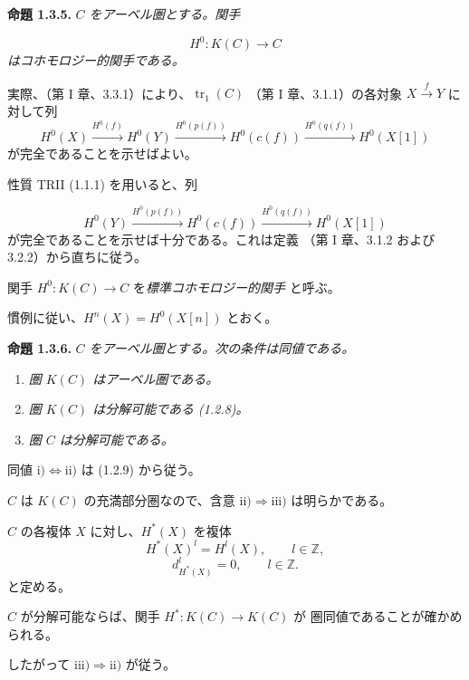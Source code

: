 
\clearpage
{}%
\begingroup
\small
\setlength{\emergencystretch}{1.5em}%
\setlength{\abovedisplayskip}{4pt plus 2pt minus 2pt}%
\setlength{\belowdisplayskip}{4pt plus 2pt minus 2pt}%

\noindent\textbf{命題 1.3.5.}\quad
\emph{$C$ をアーベル圏とする。関手}

\[
  H^0\colon K(C)\longrightarrow C
\]
\noindent\emph{はコホモロジー的関手である。}

実際、（第 I 章、3.3.1）により、$\operatorname{tr}_1(C)$
（第 I 章、3.1.1）の各対象 $X\xrightarrow{f}Y$ に対して列
\[
  H^0(X)\xrightarrow{H^0(f)}H^0(Y)
  \xrightarrow{H^0(p(f))}H^0(c(f))
  \xrightarrow{H^0(q(f))}H^0(X[1])
\]
\noindent が完全であることを示せばよい。

性質 TRII (1.1.1) を用いると、列

\[
  H^0(Y)\xrightarrow{H^0(p(f))}H^0(c(f))
  \xrightarrow{H^0(q(f))}H^0(X[1])
\]
\noindent が完全であることを示せば十分である。これは定義
（第 I 章、3.1.2 および 3.2.2）から直ちに従う。

関手 $H^0\colon K(C)\longrightarrow C$ を\emph{標準コホモロジー的関手}
と呼ぶ。

慣例に従い、$H^n(X)=H^0(X[n])$ とおく。

\medskip
\noindent\textbf{命題 1.3.6.}\quad
\emph{$C$ をアーベル圏とする。次の条件は同値である。}

\begin{enumerate}
\renewcommand{\labelenumi}{\roman{enumi})}
\item \emph{圏 $K(C)$ はアーベル圏である。}
\item \emph{圏 $K(C)$ は分解可能である (1.2.8)。}
\item \emph{圏 $C$ は分解可能である。}
\end{enumerate}

同値 $\mathrm{i)}\Longleftrightarrow\mathrm{ii)}$ は (1.2.9) から従う。

$C$ は $K(C)$ の充満部分圏なので、含意
$\mathrm{ii)}\Longrightarrow\mathrm{iii)}$ は明らかである。

$C$ の各複体 $X$ に対し、$H^*(X)$ を複体
\[
  H^*(X)^l=H^l(X),\qquad l\in\mathbb Z,
\]
\[
  d_{H^*(X)}^l=0,\qquad l\in\mathbb Z.
\]
\noindent と定める。

$C$ が分解可能ならば、関手 $H^*\colon K(C)\longrightarrow K(C)$ が
圏同値であることが確かめられる。

したがって $\mathrm{iii)}\Longrightarrow\mathrm{ii)}$ が従う。
\endgroup


